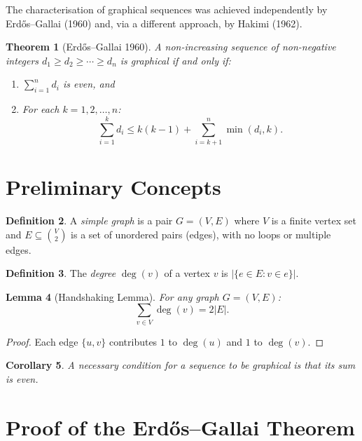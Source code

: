 \documentclass[12pt,a4paper]{amsart}
\newtheorem{theorem}{Theorem}[section]
\newtheorem{lemma}[theorem]{Lemma}
\newtheorem{corollary}[theorem]{Corollary}
\theoremstyle{definition}
\newtheorem{definition}[theorem]{Definition}
\theoremstyle{remark}
\begin{document}
The characterisation of graphical sequences was achieved independently by
Erd\H{o}s--Gallai (1960) and, via a different approach, by Hakimi (1962).

\begin{theorem}[Erd\H{o}s--Gallai 1960]
\label{thm:EG}
A non-increasing sequence of non-negative integers
$d_1 \geq d_2 \geq \cdots \geq d_n$
is graphical if and only if:
\begin{enumerate}[label=(\roman*)]
  \item $\sum_{i=1}^n d_i$ is even, and
  \item For each $k = 1, 2, \ldots, n$:
        \[
          \sum_{i=1}^k d_i \leq k(k-1) + \sum_{i=k+1}^n \min(d_i, k).
        \]
\end{enumerate}
\end{theorem}

\section{Preliminary Concepts}

\begin{definition}
A \emph{simple graph} is a pair $G = (V, E)$ where $V$ is a finite vertex
set and $E \subseteq \binom{V}{2}$ is a set of unordered pairs (edges),
with no loops or multiple edges.
\end{definition}

\begin{definition}
The \emph{degree} $\deg(v)$ of a vertex $v$ is $|\{e \in E : v \in e\}|$.
\end{definition}

\begin{lemma}[Handshaking Lemma]
For any graph $G = (V, E)$:
\[
  \sum_{v \in V} \deg(v) = 2|E|.
\]
\end{lemma}

\begin{proof}
Each edge $\{u,v\}$ contributes $1$ to $\deg(u)$ and $1$ to $\deg(v)$.
\end{proof}

\begin{corollary}
\label{cor:even}
A necessary condition for a sequence to be graphical is that its sum is even.
\end{corollary}

\section{Proof of the Erd\H{o}s--Gallai Theorem}
\end{document}

